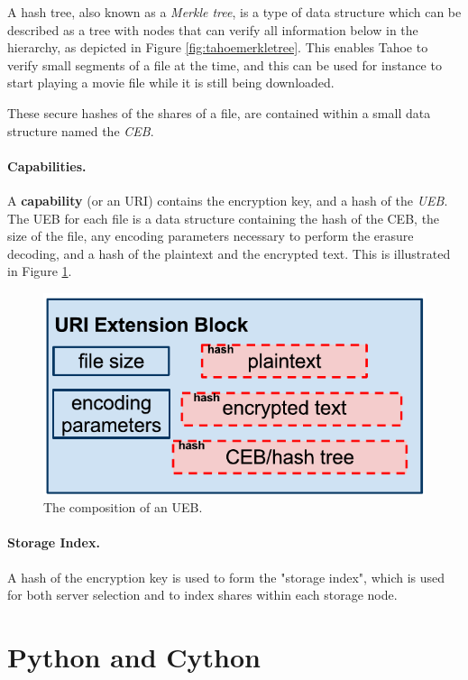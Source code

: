 \documentclass[english,12pt,a4paper]{book}
\begin{document}
A hash tree, also known as a \emph{Merkle tree}, is a type of data structure
which can be described as a tree with nodes that can verify all information
below in the hierarchy, as depicted in Figure \ref{fig:tahoemerkletree}. This
enables Tahoe to verify small segments of a file at the time, and this can be
used for instance to start playing a movie file while it is still being
downloaded.

These secure hashes of the shares of a file, are contained within a small
data structure named the \emph{\ac{CEB}}.

\paragraph{Capabilities.}

A \textbf{capability} (or an URI) contains the encryption key, and a hash of the
\emph{\ac{UEB}}. The \ac{UEB} for each file is a data structure containing the
hash of the \ac{CEB}, the size of the file, any encoding parameters necessary to
perform the erasure decoding, and a hash of the plaintext and the encrypted
text. This is illustrated in Figure \ref{fig:tahoeueb}.

\begin{figure}[!h]
    \centering
    \includegraphics[width=0.9\columnwidth]{Tahoe-UEB.pdf}
    \caption{The composition of an \ac{UEB}.}
    \label{fig:tahoeueb}
\end{figure}

\paragraph{Storage Index.}

A hash of the encryption key is used to form the "storage index", which is
used for both server selection and to index shares within each storage node.

\section{Python and Cython}
\end{document}

